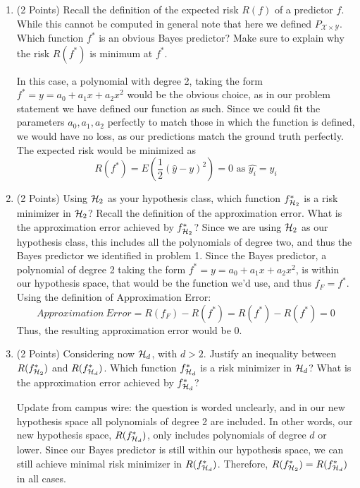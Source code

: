 \documentclass{article}
\begin{document}
\begin{enumerate}
    \item (2 Points) Recall the definition of the expected risk $R(f)$ of a predictor $f$. While this cannot be computed in general note that here we defined $P_{\mathcal{X} \times \mathcal{Y}}$. Which function $f^*$ is an obvious Bayes predictor? Make sure to explain why the risk $R(f^*)$ is minimum at $f^*$.
    
    \subitem 
    In this case, a polynomial with degree 2, taking the form $f^* = y = a_0 + a_1x + a_2x^2$ would be the obvious choice, as in our problem statement we have defined our function as such. Since we could fit the parameters $a_0,a_1,a_2$ perfectly to match those in which the function is defined, we would have no loss, as our predictions match the ground truth perfectly. The expected risk would be minimized as $$
    R(f^*) = E(\frac{1}{2}(\hat{y}-y)^2) = 0 \text{ as } \hat{y_i} = y_i
    $$
    
    \item (2 Points) Using ${\mathcal{H}}_2$ as your hypothesis class, which function $f^*_{{\mathcal{H}}_2}$ is a risk minimizer in ${\mathcal{H}}_2$? Recall the definition of the approximation error. What is the approximation error achieved by $f^*_{{\mathcal{H}}_2}$?
    \subitem
    Since we are using ${\mathcal{H}}_2$ as our hypothesis class, this includes all the polynomials of degree two, and thus the Bayes predictor we identified in problem 1. Since the Bayes predictor, a polynomial of degree 2 taking the form $f^* = y = a_0 + a_1x + a_2x^2$, is within our hypothesis space, that would be the function we'd use, and thus $f_F = f^*$. Using the definition of Approximation Error:
    $$Approximation \ Error = R(f_F) - R(f^*) = R(f^*) - R(f^*) = 0$$
    Thus, the resulting approximation error would be 0.
    \item (2 Points) Considering now ${\mathcal{H}}_d$, with $d>2$. Justify an inequality between $R(f^*_{{\mathcal{H}}_2})$ and $R(f^*_{{\mathcal{H}}_d})$. Which function $f^*_{{\mathcal{H}}_d}$ is a risk minimizer in ${\mathcal{H}}_d$? What is the approximation error achieved by $f^*_{{\mathcal{H}}_d}$?
    
    \subitem Update from campus wire: the question is worded unclearly, and in our new hypothesis space all polynomials of degree 2 are included. In other words, our new hypothesis space, $R(f^*_{{\mathcal{H}}_d})$, only includes polynomials of degree $d$ or lower. Since our Bayes predictor is still within our hypothesis space, we can still achieve minimal risk minimizer in $R(f^*_{{\mathcal{H}}_d})$. 
    Therefore, $R(f^*_{{\mathcal{H}}_2}) = R(f^*_{{\mathcal{H}}_d})$ in all cases.
    

\end{enumerate}
\end{document}
